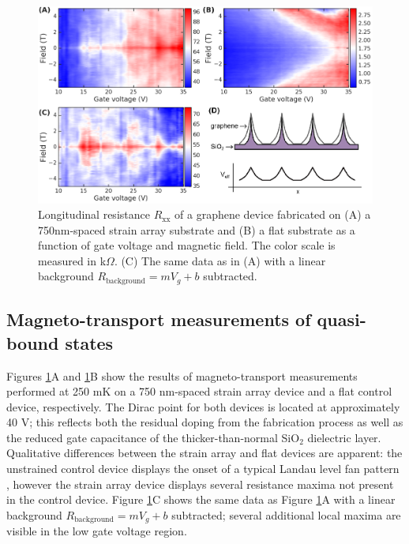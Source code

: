 \documentclass[edeposit,fullpage,draftthesis]{uiucthesis2009}
\begin{document}
            \begin{figure}
            \centering
            \includegraphics[width=\columnwidth]{images/resultsanddiscussion/strainarraypaper/Figure4_1}
            \caption{
                Longitudinal resistance $R_\text{xx}$ of a graphene device fabricated on (A) a 750nm-spaced
                strain array substrate and (B) a flat substrate as a function of gate voltage and magnetic field. 
                The color scale is measured in k$\Omega$.
                (C) The same data as in (A) with a linear background $R_\text{background} = m V_g + b$ subtracted.
            }
            \label{'fig:transport'}
            \end{figure}
            
    \subsection{Magneto-transport measurements of quasi-bound states}
    \label{sec:sa_project}
            
            Figures \ref{'fig:transport'}A and \ref{'fig:transport'}B show the results of magneto-transport 
            measurements performed at 250 mK on a 750 nm-spaced strain array device and a flat control device, respectively.
            The Dirac point for both devices is located at approximately 40 V; this reflects both the residual doping
            from the fabrication process as well as the reduced gate capacitance of the thicker-than-normal SiO$_2$ dielectric layer.
            Qualitative differences between the strain array and flat devices are apparent: 
            the unstrained control device displays the onset of a typical Landau level fan pattern \cite{bolotin2009observation}, 
            however the strain array device displays several resistance maxima not present in the control device.
            Figure \ref{'fig:transport'}C shows the same data as Figure \ref{'fig:transport'}A with a linear background 
            $R_\text{background} = m V_g + b$ subtracted; several additional local maxima are visible in the low gate voltage region.
            
\end{document}
